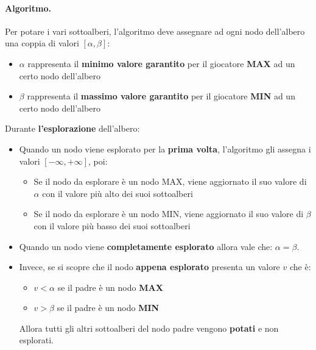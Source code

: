 \paragraph{Algoritmo.}Per potare i vari sottoalberi, l'algoritmo deve assegnare ad ogni nodo dell'albero una coppia di valori $\left[\alpha, \beta\right]$:
\begin{itemize}
    \item $\alpha$ rappresenta il \textbf{minimo valore garantito} per il giocatore \textbf{MAX} ad un certo nodo dell'albero
    \item $\beta$ rappresenta il \textbf{massimo valore garantito} per il giocatore \textbf{MIN} ad un certo nodo dell'albero
\end{itemize}
Durante \textbf{l'esplorazione} dell'albero:
\begin{itemize}
    \item Quando un nodo viene esplorato per la \textbf{prima volta}, l'algoritmo gli assegna i valori $\left[-\infty,+\infty\right]$, poi:
    \begin{itemize}
        \item Se il nodo da esplorare è un nodo MAX, viene aggiornato il suo valore di $\alpha$ con il valore più alto dei suoi sottoalberi
        \item Se il nodo da esplorare è un nodo MIN, viene aggiornato il suo valore di $\beta$ con il valore più basso dei suoi sottoalberi
    \end{itemize}
    \item Quando un nodo viene \textbf{completamente esplorato} allora vale che: $\alpha = \beta$.
    \item Invece, se si scopre che il nodo \textbf{appena esplorato} presenta un valore $v$ che è:
    \begin{itemize}
        \item $v < \alpha$ se il padre è un nodo \textbf{MAX}
        \item $v > \beta$ se il padre è un nodo \textbf{MIN}
    \end{itemize}
    Allora tutti gli altri sottoalberi del nodo padre vengono \textbf{potati} e non esplorati.
\end{itemize}


